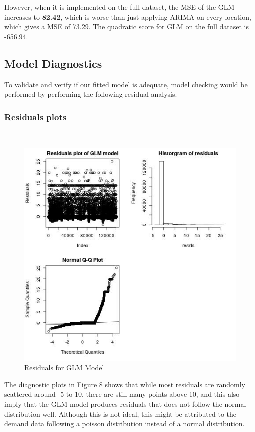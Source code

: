 \documentclass[nonblindrev,msom]{informs3} %
\begin{document}
\noindent However, when it is implemented on the full dataset, the MSE of the GLM increases to \textbf{82.42}, which is worse than just applying ARIMA on every location, which gives a MSE of 73.29. The quadratic score for GLM on the full dataset is -656.94.

\subsection{Model Diagnostics}
To validate and verify if our fitted model is adequate, model checking would be performed by performing the following residual analysis.		

\newpage
\subsubsection{Residuals plots}
\hfill\\
\begin{figure}[H]
    \centering
    \includegraphics[width=\textwidth, height=0.7\textheight]{Images/Full_GLM_resids.jpg}
    \caption{Residuals for GLM Model}
    \label{fig:Residuals for GLM Model}
\end{figure}

\noindent The diagnostic plots in Figure 8 shows that while most residuals are randomly scattered around -5 to 10, there are still many points above 10, and this also imply that the GLM model produces residuals that does not follow the normal distribution well. Although this is not ideal, this might be attributed to the demand data following a poisson distribution instead of a normal distribution. 
\end{document}
